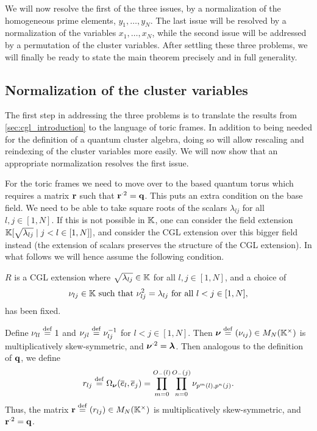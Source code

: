 We will now resolve the first of the three issues, by a normalization of the
homogeneous prime elements, $y_1, \dots, y_N$. The last issue will be resolved by a
normalization of the variables $x_1, \dots, x_N$, while the second issue will be
addressed by a permutation of the cluster variables. After settling these three
problems, we will finally be ready to state the main theorem precisely and in full
generality.

\subsection{Normalization of the cluster variables}

The first step in addressing the three problems is to translate the results from
\cref{sec:cgl_introduction} to the language of toric frames. In addition to being
needed for the definition of a quantum cluster algebra, doing so will allow rescaling
and reindexing of the cluster variables more easily. We will now show that an
appropriate normalization resolves the first issue.

\medskip

For the toric frames we need to move over to the based quantum torus which requires a
matrix $\mathbf{r}$ such that $\mathbf{r}^{\cdot 2} = \mathbf{q}$. This puts an extra condition on the
base field. We need to be able to take square roots of the scalars $\lambda_{lj}$ for
all $l,j \in [1, N]$. If this is not possible in $\mathbb{K}$, one can consider the field
extension $\mathbb{K}[\sqrt{\lambda_{lj}} \mid j < l \in [1, N]]$, and consider the CGL
extension over this bigger field instead (the extension of scalars preserves the
structure of the CGL extension). In what follows we will hence assume the following
condition.

\begin{condition}\label{cond:square_roots}
	$R$ is a CGL extension where $\sqrt{\lambda_{lj}} \in \mathbb{K}$ for all
	$l, j \in [1, N]$, and a choice of
	\begin{equation*}
		\nu_{lj} \in \mathbb{K} \text{ such that } \nu^2_{lj} = \lambda_{lj}\text{ for all } l < j \in [1,N],
	\end{equation*}
	has been fixed.
\end{condition}

Define $\nu_{ll} \overset{\mathrm{def}}{=} 1$ and $\nu_{jl} \overset{\mathrm{def}}{=} \nu_{lj}^{-1}$ for $l < j \in [1, N]$.
Then $\boldsymbol{\nu} \overset{\mathrm{def}}{=} (\nu_{ij}) \in M_N(\mathbb{K}^\times)$ is multiplicatively
skew-symmetric, and $\boldsymbol{\nu}^{\cdot 2} = \boldsymbol{\lambda}$. Then analogous to the
definition of $\mathbf{q}$, we define
\begin{equation*}
	r_{lj} \overset{\mathrm{def}}{=} \Omega_{\boldsymbol{\nu}}(\overline{e}_l, \overline{e}_j) = \prod_{m=0}^{O_{-}(l)}\prod_{n=0}^{O_{-}(j)}\nu_{p^m(l), p^n(j)}.
\end{equation*}
%
Thus, the matrix $\mathbf{r} \overset{\mathrm{def}}{=} (r_{lj}) \in M_N(\mathbb{K}^\times)$ is
multiplicatively skew-symmetric, and $\mathbf{r}^{\cdot 2} = \mathbf{q}$.

